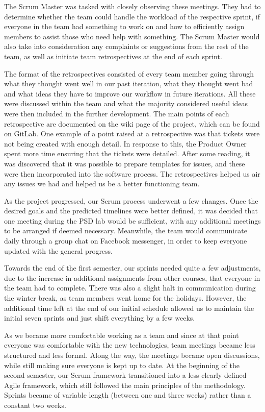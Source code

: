 \documentclass{l3proj}
\begin{document}
 The Scrum Master was tasked with closely observing these meetings. They had
  to determine whether the team could handle the workload of the respective
  sprint, if everyone in the team had something to work on and how to efficiently
  assign members to assist those who need help with something. The Scrum
  Master would also take into consideration any complaints or suggestions from
  the rest of the team, as well as initiate team retrospectives at the end of
  each sprint.
  
The format of the retrospectives
 consisted of every team member going through what they thought went well in
 our past iteration, what they thought went bad and what ideas they have to
 improve our workflow in future iterations. All these were discussed within
 the team and what the majority considered useful ideas were then included
 in the further development. The main points of each retrospective are
 documented on the wiki page of the project, which can be found on GitLab. One
 example of a point raised at a retrospective was that tickets were not being 
 created with enough detail. In response to this, the Product Owner spent more
 time ensuring that the tickets were detailed. After some reading, it was discovered
 that it was possible to prepare templates for issues, and these were then incorporated
 into the software process. The retrospectives helped us air any issues we had 
 and helped us be a better functioning team.

 As the project progressed, our Scrum process underwent a few changes. Once
 the desired goals and the predicted timelines were better defined, it was
 decided that one meeting during the PSD lab would be sufficient, with any
 additional meetings to be arranged if deemed necessary. Meanwhile, the team
 would communicate daily through a group chat on Facebook messenger, in order
 to keep everyone updated with the general progress.

Towards the end of the first semester, our sprints needed quite a few
 adjustments, due to the increase in additional assignments from other
 courses, that everyone in the team had to complete. There was also a
 slight halt in communication during the winter break, as team members
 went home for the holidays. However, the additional time left at the
 end of our initial schedule allowed us to maintain the initial seven
 sprints and just shift everything by a few weeks.

As we became more comfortable working as a team and since at that
 point everyone was comfortable with the new technologies, team
 meetings became less structured and less formal. Along the way,
 the meetings became open discussions, while still making sure
 everyone is kept up to date. At the beginning of the second
 semester, our Scrum framework transitioned into a less clearly
 defined Agile framework, which still followed the main principles
 of the methodology. Sprints became of variable length (between
 one and three weeks) rather than a constant two weeks.
\end{document}
